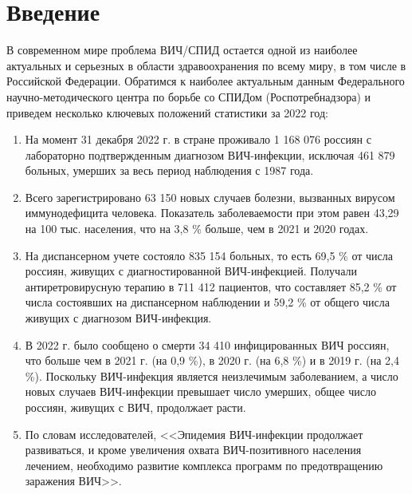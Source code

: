 \chapter*{Введение}
\label{ch:intro}
\linespread{1.5}
    В современном мире проблема ВИЧ/СПИД остается одной из наиболее актуальных и серьезных в области здравоохранения по всему миру, в том числе в Российской Федерации. Обратимся к наиболее актуальным данным Федерального научно-методического центра по борьбе со СПИДом (Роспотребнадзора) \cite{Справка_по_ВИЧ-инфекции_в_России_Роспотребнадзор_2022} и приведем несколько ключевых положений статистики за 2022 год: 
    
\begin{enumerate}
    \item  На момент 31 декабря 2022 г. в стране проживало 1 168 076 россиян с лабораторно подтвержденным диагнозом ВИЧ-инфекции, исключая 461 879 больных, умерших за весь период наблюдения с 1987 года.
    
    \item Всего зарегистрировано 63 150 новых случаев болезни, вызванных вирусом иммунодефицита человека. Показатель заболеваемости при этом равен 43,29 на 100 тыс. населения, что на 3,8 \% больше, чем в 2021 и 2020 годах.
    
    \item На диспансерном учете состояло 835 154 больных, то есть 69,5 \% от числа россиян, живущих с диагностированной ВИЧ-инфекцией. Получали антиретровирусную терапию в 711 412 пациентов, что составляет 85,2 \% от числа состоявших на диспансерном наблюдении и 59,2 \% от общего числа живущих с диагнозом ВИЧ-инфекция.

    \item В 2022 г. было сообщено о смерти 34 410 инфицированных ВИЧ россиян, что больше чем в 2021 г. (на 0,9 \%), в 2020 г. (на 6,8 \%) и в 2019 г. (на 2,4 \%). Поскольку ВИЧ-инфекция является неизлечимым заболеванием, а число новых случаев ВИЧ-инфекции превышает число умерших, общее число россиян, живущих с ВИЧ, продолжает расти.
    
    \item По словам исследователей, <<Эпидемия ВИЧ-инфекции продолжает развиваться, и кроме увеличения охвата ВИЧ-позитивного 
    населения лечением, необходимо развитие комплекса программ по предотвращению заражения ВИЧ>>.    
    
\end{enumerate}


